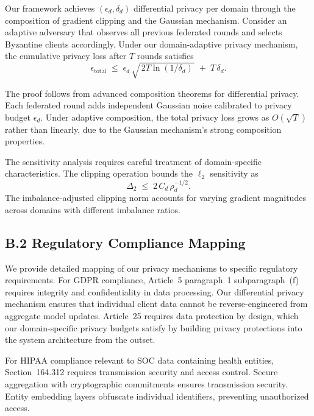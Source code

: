 \documentclass[12pt,a4paper]{article}
\theoremstyle{definition}
\begin{document}
\begingroup
\setlength{\emergencystretch}{2em}

Our framework achieves \((\epsilon_d,\delta_d)\) differential privacy per domain through the composition of gradient clipping and the Gaussian mechanism. Consider an adaptive adversary that observes all previous federated rounds and selects Byzantine clients accordingly. Under our domain-adaptive privacy mechanism, the cumulative privacy loss after \(T\) rounds satisfies
\[
\epsilon_{\text{total}}
\;\le\;
\epsilon_d\,\sqrt{\,2T\ln(1/\delta_d)\,}\;+\;T\,\delta_d.
\]

The proof follows from advanced composition theorems for differential privacy. Each federated round adds independent Gaussian noise calibrated to privacy budget \(\epsilon_d\). Under adaptive composition, the total privacy loss grows as \(O(\sqrt{T})\) rather than linearly, due to the Gaussian mechanism’s strong composition properties.

The sensitivity analysis requires careful treatment of domain-specific characteristics. The clipping operation bounds the \(\ell_2\) sensitivity as
\[
\Delta_{2}\;\le\;2\,C_d\,\rho_d^{-1/2}.
\]
The imbalance-adjusted clipping norm accounts for varying gradient magnitudes across domains with different imbalance ratios.

\endgroup

\subsection{B.2 Regulatory Compliance Mapping}

\begingroup
\setlength{\emergencystretch}{2em}

We provide detailed mapping of our privacy mechanisms to specific regulatory requirements. For GDPR compliance, Article~5 paragraph~1 subparagraph~(f) requires integrity and confidentiality in data processing. Our differential privacy mechanism ensures that individual client data cannot be reverse-engineered from aggregate model updates. Article~25 requires data protection by design, which our domain-specific privacy budgets satisfy by building privacy protections into the system architecture from the outset.

For HIPAA compliance relevant to SOC data containing health entities, Section~164.312 requires transmission security and access control. Secure aggregation with cryptographic commitments ensures transmission security. Entity embedding layers obfuscate individual identifiers, preventing unauthorized access.
\end{document}
